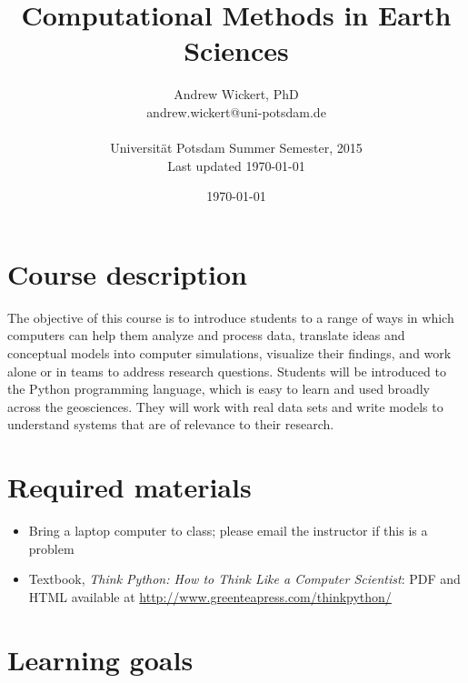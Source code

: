 \documentclass[10pt,a4paper]{amsart}
\title{Computational Methods in Earth Sciences}
\author{Andrew Wickert, PhD\\
	{andrew.wickert@uni-potsdam.de}\\
        \\
        Universit\"{a}t Potsdam Summer Semester, 2015\\
        Last updated \today}
\date{\today}
\begin{document}
\vspace{-10cm}

\maketitle

\section{Course description}

The objective of this course is to introduce students to a range of ways in which computers can help them analyze and process data, translate ideas and conceptual models into computer simulations, visualize their findings, and work alone or in teams to address research questions. Students will be introduced to the Python programming language, which is easy to learn and used broadly across the geosciences. They will work with real data sets and write models to understand systems that are of relevance to their research.

\section{Required materials}
\begin{itemize}
 \item Bring a laptop computer to class; please email the instructor if this is a problem
 \item Textbook, \emph{Think Python: How to Think Like a Computer Scientist}: PDF and HTML available at \url{http://www.greenteapress.com/thinkpython/}
\end{itemize}

\section{Learning goals}
\end{document}
